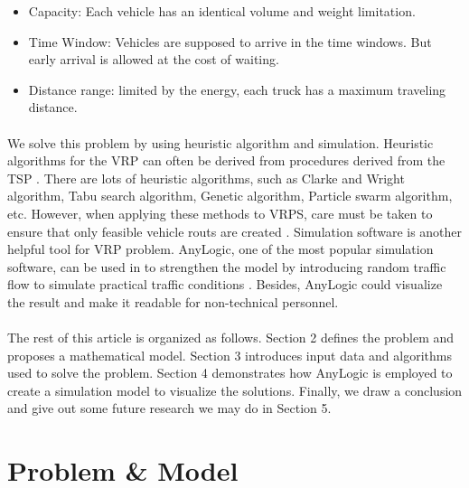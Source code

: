 \documentclass[12pt]{article}
\numberwithin{equation}{section}
\begin{document}
	\begin{itemize}
		\item Capacity: Each vehicle has an identical volume and weight limitation.
		
		\item Time Window: Vehicles are supposed to arrive in the time windows. But early arrival is allowed at the cost of waiting.
		
		\item Distance range: limited by the energy, each truck has a maximum traveling distance. 
	\end{itemize}

	\paragraph{}We solve this problem by using heuristic algorithm and simulation. Heuristic algorithms for the VRP can often be derived from procedures derived from the TSP \parencite{Laporte1992}. There are lots of heuristic algorithms, such as Clarke and Wright algorithm, Tabu search algorithm, Genetic algorithm, Particle swarm algorithm, etc. However, when applying these methods to VRPS, care must be taken to ensure that only feasible vehicle routs are created \parencite{Laporte1992}. Simulation software is another helpful tool for VRP problem. AnyLogic, one of the most popular simulation software, can be used in to strengthen the model by introducing random traffic flow to simulate practical traffic conditions \parencite{Fan2009}. Besides, AnyLogic could visualize the result and make it readable for non-technical personnel.
	
	\paragraph{}The rest of this article is organized as follows. Section 2 defines the problem and proposes a mathematical model. Section 3 introduces input data and algorithms used to solve the problem. Section 4 demonstrates how AnyLogic is employed to create a simulation model to visualize the solutions. Finally, we draw a conclusion and give out some future research we may do in Section 5.


\section{Problem \& Model}
\end{document}
